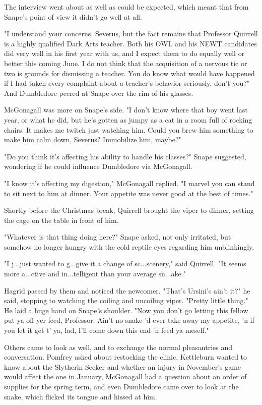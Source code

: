 The interview went about as well as could be expected, which meant that from Snape's point of view it didn't go well at all.

"I understand your concerns, Severus, but the fact remains that Professor Quirrell is a highly qualified Dark Arts teacher. Both his OWL and his NEWT candidates did very well in his first year with us, and I expect them to do equally well or better this coming June. I do not think that the acquisition of a nervous tic or two is grounds for dismissing a teacher. You do know what would have happened if I had taken every complaint about a teacher's behavior seriously, don't you?" And Dumbledore peered at Snape over the rim of his glasses.

McGonagall was more on Snape's side. "I don't know where that boy went last year, or what he did, but he's gotten as jumpy as a cat in a room full of rocking chairs. It makes me twitch just watching him. Could you brew him something to make him calm down, Severus? Immobilize him, maybe?"

"Do you think it's affecting his ability to handle his classes?" Snape suggested, wondering if he could influence Dumbledore via McGonagall.

"I know it's affecting my digestion," McGonagall replied. "I marvel you can stand to sit next to him at dinner. Your appetite was never good at the best of times."

Shortly before the Christmas break, Quirrell brought the viper to dinner, setting the cage on the table in front of him.

"Whatever is that thing doing here?" Snape asked, not only irritated, but somehow no longer hungry with the cold reptile eyes regarding him unblinkingly.

"I j...just wanted to g...give it a change of sc...scenery," said Quirrell. "It seems more a...ctive and in...telligent than your average sn...ake."

Hagrid passed by them and noticed the newcomer. "That's Ursini's ain't it?" he said, stopping to watching the coiling and uncoiling viper. "Pretty little thing." He laid a huge hand on Snape's shoulder. "Now you don't go letting this fellow put ya off yer feed, Professor. Ain't no snake 'd ever take away my appetite, 'n if you let it get t' ya, lad, I'll come down this end 'n feed ya meself."

Others came to look as well, and to exchange the normal pleasantries and conversation. Pomfrey asked about restocking the clinic, Kettleburn wanted to know about the Slytherin Seeker and whether an injury in November's game would affect the one in January, McGonagall had a question about an order of supplies for the spring term, and even Dumbledore came over to look at the snake, which flicked its tongue and hissed at him.

